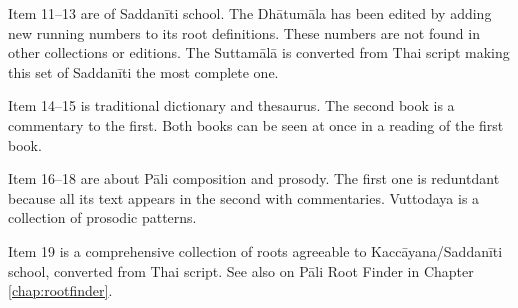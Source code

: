 Item 11--13 are of Saddanīti school. The Dhātumāla has been edited by adding new running numbers to its root definitions. These numbers are not found in other collections or editions. The Suttamālā is converted from Thai script making this set of Saddanīti the most complete one.

Item 14--15 is traditional dictionary and thesaurus. The second book is a commentary to the first. Both books can be seen at once in a reading of the first book.

Item 16--18 are about Pāli composition and prosody. The first one is reduntdant because all its text appears in the second with commentaries. Vuttodaya is a collection of prosodic patterns.

Item 19 is a comprehensive collection of roots agreeable to Kaccāyana/Saddanīti school, converted from Thai script. See also on Pāli Root Finder in Chapter \ref{chap:rootfinder}.
